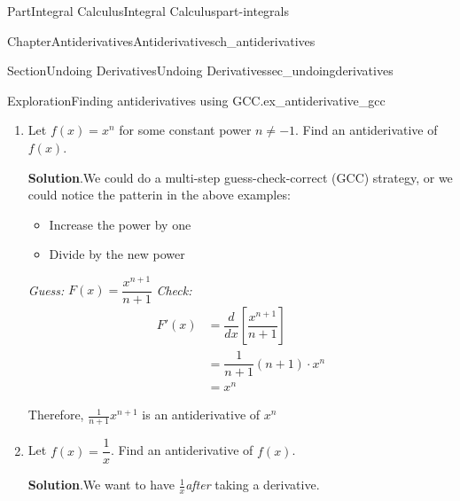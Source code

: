 \documentclass[oneside,10pt,]{tufte-book}
\newcommand{\blocktitlefont}{\relax}
\numberwithin{equation}{chapter}
\newcommand{\red}[1]{   {\color{red}   #1}   }
\newcommand{\ddx}[1]{ \dfrac{d}{dx} \Big[ #1 \Big]  }
\newcommand{\ddxfrac}[1]{ \dfrac{d}{dx} \left[ #1 \right]  }
\newcommand{\amp}{&}
\begin{document}
\begin{partptx}{Part}{Integral Calculus}{}{Integral Calculus}{}{}{part-integrals}
\begin{chapterptx}{Chapter}{Antiderivatives}{}{Antiderivatives}{}{}{ch_antiderivatives}
\begin{sectionptx}{Section}{Undoing Derivatives}{}{Undoing Derivatives}{}{}{sec_undoingderivatives}
\begin{exploration}{Exploration}{Finding antiderivatives using GCC.}{ex_antiderivative_gcc}
\begin{enumerate}[font=\bfseries,label=(\alph*),ref=\alph*]
\par
A general strategy is first to get the power of the antiderivative, and then get the coefficient.%
\begin{descriptionlist}
\begin{dlimedium}{Guess 1}{ex_antiderivative_gcc-3-2-2-1-1}%
\emph{Guess:} \(F(x) = x^{12}\)%
\par
\emph{Check:}%
\begin{equation*}
F'(x) = \ddx{x^{12}} = 12x^{11} \red{\ \neq\ x^11}
\end{equation*}
%
\end{dlimedium}%
\begin{dlimedium}{Guess 2}{ex_antiderivative_gcc-3-2-2-1-2}%
\emph{Guess:} \(F(x) = \frac{1}{12}x^{12}\)%
\par
\emph{Check:}%
\begin{equation*}
F'(x) = \ddx{\frac{1}{12}x^{12}} = \frac{1}{12}12x^{11} = x^11
\end{equation*}
%
\end{dlimedium}%
\end{descriptionlist}
Therefore \(\frac{1}{12}x^{12}\) is an antiderivative of \(x^{11}\)%
\item{}Let \(f(x)=x^n\) for some constant power \(n\neq -1\). Find an antiderivative of \(f(x)\).%
\par\smallskip%
\noindent\textbf{\blocktitlefont Solution}.\hypertarget{ex_antiderivative_gcc-4-2}{}\quad{}We could do a multi-step guess-check-correct (GCC) strategy, or we could notice the patterin in the above examples:%
\begin{itemize}[label=\textbullet]
\item{}Increase the power by one%
\item{}Divide by the new power%
\end{itemize}
%
\par
\emph{Guess:} \(F(x) = \dfrac{ x^{n+1} }{ n+1 }\) \emph{Check:}%
\begin{align*}
F'(x) \amp = \ddxfrac{ \dfrac{ x^{n+1} }{ n+1 } }\\
\amp = \dfrac{1}{n+1} (n+1) \cdot x^n\\
\amp = x^n
\end{align*}
%
\par
Therefore, \(\displaystyle \frac{1}{n+1}x^{n+1}\) is an antiderivative of \(x^n\)%
\item{}Let \(f(x) = \dfrac{1}{x}\).  Find an antiderivative of \(f(x)\).%
\par\smallskip%
\noindent\textbf{\blocktitlefont Solution}.\hypertarget{ex_antiderivative_gcc-5-2}{}\quad{}We want to have \(\frac{1}{x}\)\emph{after} taking a derivative.%

\end{enumerate}
\end{exploration}
\end{sectionptx}
\end{chapterptx}
\end{partptx}
\end{document}

